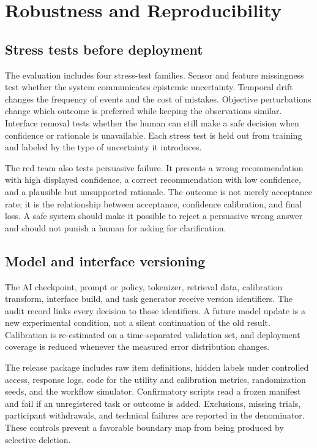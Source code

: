 \documentclass[conference]{IEEEtran}
\begin{document}
\section{Robustness and Reproducibility}

\subsection{Stress tests before deployment}

The evaluation includes four stress-test families. Sensor and feature missingness test whether the system communicates epistemic uncertainty. Temporal drift changes the frequency of events and the cost of mistakes. Objective perturbations change which outcome is preferred while keeping the observations similar. Interface removal tests whether the human can still make a safe decision when confidence or rationale is unavailable. Each stress test is held out from training and labeled by the type of uncertainty it introduces.

The red team also tests persuasive failure. It presents a wrong recommendation with high displayed confidence, a correct recommendation with low confidence, and a plausible but unsupported rationale. The outcome is not merely acceptance rate; it is the relationship between acceptance, confidence calibration, and final loss. A safe system should make it possible to reject a persuasive wrong answer and should not punish a human for asking for clarification.

\subsection{Model and interface versioning}

The AI checkpoint, prompt or policy, tokenizer, retrieval data, calibration transform, interface build, and task generator receive version identifiers. The audit record links every decision to those identifiers. A future model update is a new experimental condition, not a silent continuation of the old result. Calibration is re-estimated on a time-separated validation set, and deployment coverage is reduced whenever the measured error distribution changes.

The release package includes raw item definitions, hidden labels under controlled access, response logs, code for the utility and calibration metrics, randomization seeds, and the workflow simulator. Confirmatory scripts read a frozen manifest and fail if an unregistered task or outcome is added. Exclusions, missing trials, participant withdrawals, and technical failures are reported in the denominator. These controls prevent a favorable boundary map from being produced by selective deletion.
\end{document}
